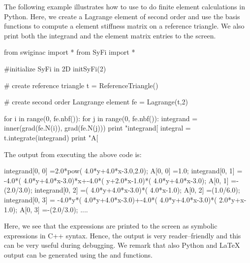 The following example illustrates how to use \syfi{} to do finite element
calculations in Python.  Here, we create a Lagrange element of second
order and use the basis functions to compute a element stiffness matrix
on a reference triangle. We also print both the integrand and the element
matrix entries to the screen.
\begin{python}
from swiginac import *
from SyFi import *

#initialize SyFi in 2D
initSyFi(2)

# create reference triangle
t = ReferenceTriangle()

# create second order Langrange element
fe = Lagrange(t,2)

for i in range(0, fe.nbf()):
    for j in range(0, fe.nbf()):
        integrand = inner(grad(fe.N(i)), grad(fe.N(j)))
        print "integrand[%
        integral = t.integrate(integrand)
        print "A[%
\end{python}
The output from executing the above code is:
\begin{c++}
integrand[0, 0]  =2.0*pow( 4.0*y+4.0*x-3.0,2.0);
A[0, 0]          =1.0;
integrand[0, 1]  = -4.0*( 4.0*y+4.0*x-3.0)*x+-4.0*( y+2.0*x-1.0)*( 4.0*y+4.0*x-3.0);
A[0, 1]          =-(2.0/3.0);
integrand[0, 2]  =( 4.0*y+4.0*x-3.0)*( 4.0*x-1.0);
A[0, 2]          =(1.0/6.0);
integrand[0, 3]  = -4.0*y*( 4.0*y+4.0*x-3.0)+-4.0*( 4.0*y+4.0*x-3.0)*( 2.0*y+x-1.0);
A[0, 3]          =-(2.0/3.0);
....
\end{c++}
Here, we see that the expressions are printed to the screen as symbolic
expressions in C++ syntax. Hence, the output is very reader--friendly
and this can be very useful during debugging.  We remark that also
Python and LaTeX output can be generated using the 
and  functions.

